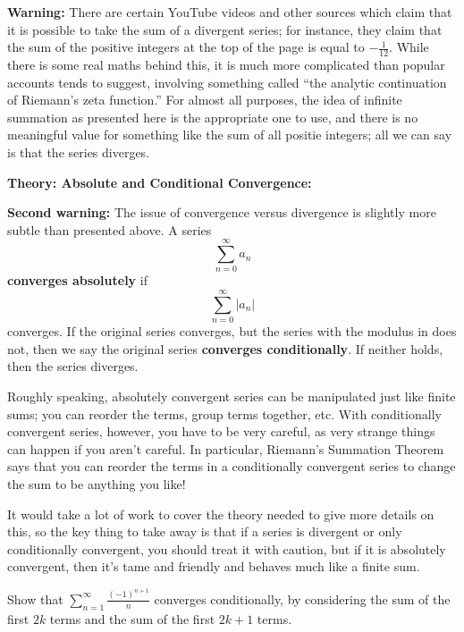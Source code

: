 \documentclass{article}
\begin{document}
\vfill


{\color{red}


\textbf{Warning:} There are certain YouTube videos and other sources which claim that it is possible to take the sum of a divergent series; for instance, they claim that the sum of the positive integers at the top of the page is equal to $-\frac{1}{12}$. While there is some real maths behind this, it is much more complicated than popular accounts tends to suggest, involving something called ``the analytic continuation of Riemann's zeta function.'' For almost all purposes, the idea of infinite summation as presented here is the appropriate one to use, and there is no meaningful value for something like the sum of all positie integers; all we can say is that the series diverges.




\clearpage




\textbf{Theory: Absolute and Conditional Convergence:}

\vspace{5mm}



\textbf{Second warning:} The issue of convergence versus divergence is slightly more subtle than presented above. A series 
\[\sum_{n=0}^\infty a_n\]
\textbf{converges absolutely} if
\[\sum_{n=0}^\infty |a_n|\]
converges. If the original series converges, but the series with the modulus in does not, then we say the original series \textbf{converges conditionally}. If neither holds, then the series diverges.

Roughly speaking, absolutely convergent series can be manipulated just like finite sums; you can reorder the terms, group terms together, etc. With conditionally convergent series, however, you have to be very careful, as very strange things can happen if you aren't careful. In particular, Riemann's Summation Theorem says that you can reorder the terms in a conditionally convergent series to change the sum to be anything you like!

It would take a lot of work to cover the theory needed to give more details on this, so the key thing to take away is that if a series is divergent or only conditionally convergent, you should treat it with caution, but if it is absolutely convergent, then it's tame and friendly and behaves much like a finite sum.\bigskip

\bigskip



Show that $\sum\limits_{n=1}^\infty \frac{(-1)^{n+1}}{n}$ converges conditionally, by considering the sum of the first $2k$ terms and the sum of the first $2k+1$ terms.

\vfill
}
\end{document}
